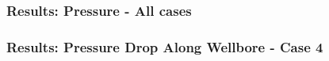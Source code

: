 \begin{frame}
    \frametitle{Results: Pressure - All cases}
    \centerline{}
\end{frame}


\begin{frame}
    \frametitle{Results: Pressure Drop Along Wellbore - Case 4}
    \centerline{}
\end{frame}
